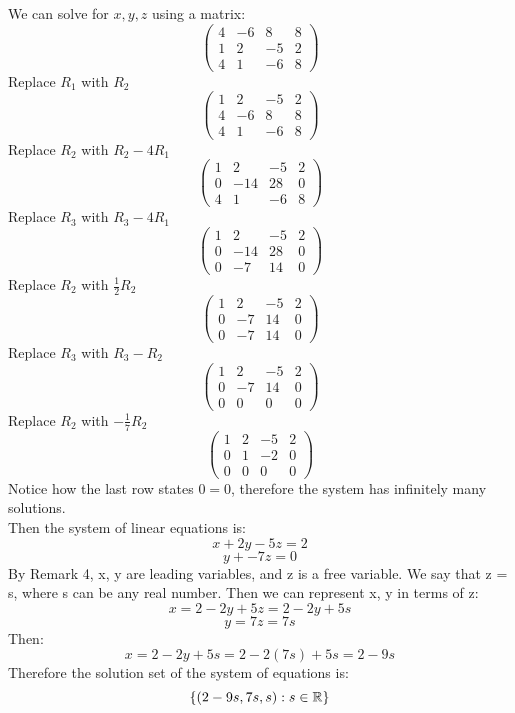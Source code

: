 \documentclass{article}
\begin{document}
\begin{homeworkProblem}
    \solution
    We can solve for $x, y, z$ using a matrix:
    $$\begin{pmatrix}
            4 & -6 & 8  & 8 \\
            1 & 2  & -5 & 2 \\
            4 & 1  & -6 & 8
        \end{pmatrix}$$
    Replace $R_1$ with $R_2$
    $$\begin{pmatrix}
            1 & 2  & -5 & 2 \\
            4 & -6 & 8  & 8 \\
            4 & 1  & -6 & 8
        \end{pmatrix}$$
    Replace $R_2$ with $R_2 - 4R_1$
    $$\begin{pmatrix}
            1 & 2   & -5 & 2 \\
            0 & -14 & 28 & 0 \\
            4 & 1   & -6 & 8
        \end{pmatrix}$$
    Replace $R_3$ with $R_3 - 4R_1$
    $$\begin{pmatrix}
            1 & 2   & -5 & 2 \\
            0 & -14 & 28 & 0 \\
            0 & -7  & 14 & 0
        \end{pmatrix}$$
    Replace $R_2$ with $\frac{1}{2}R_2$
    $$\begin{pmatrix}
            1 & 2  & -5 & 2 \\
            0 & -7 & 14 & 0 \\
            0 & -7 & 14 & 0
        \end{pmatrix}$$
    Replace $R_3$ with $R_3 - R_2$
    $$\begin{pmatrix}
            1 & 2  & -5 & 2 \\
            0 & -7 & 14 & 0 \\
            0 & 0  & 0  & 0
        \end{pmatrix}$$
    Replace $R_2$ with $-\frac{1}{7}R_2$
    $$\begin{pmatrix}
            1 & 2 & -5 & 2 \\
            0 & 1 & -2 & 0 \\
            0 & 0 & 0  & 0
        \end{pmatrix}$$
    Notice how the last row states $0 = 0$, therefore the system has infinitely many solutions.\\
    Then the system of linear equations is: $$x + 2y - 5z = 2$$ $$y + -7z = 0$$
    By Remark 4, x, y are leading variables, and z is a free variable. We say that z = s, where s can be any real number.
    Then we can represent x, y in terms of z: $$ x = 2 - 2y + 5z = 2 - 2y + 5s $$ $$y = 7z = 7s$$ Then: $$x = 2 - 2y + 5s = 2 - 2(7s) + 5s = 2 - 9s$$
    Therefore the solution set of the system of equations is:$$\left\{(2 - 9s, 7s,s):s \in \mathbb{R}\right\}$$
\end{homeworkProblem}
\end{document}
